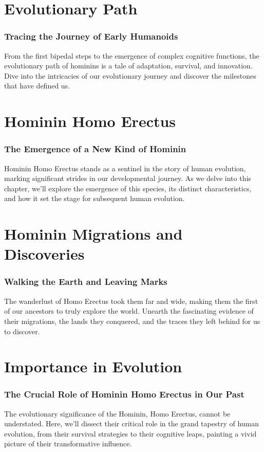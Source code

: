 \documentclass[a4paper,12pt]{book}
\begin{document}
\chapter{Evolutionary Path}
\subsection*{Tracing the Journey of Early Humanoids}
From the first bipedal steps to the emergence of complex cognitive functions, the evolutionary path of hominins is a tale of adaptation, survival, and innovation. Dive into the intricacies of our evolutionary journey and discover the milestones that have defined us.

\chapter{Hominin Homo Erectus}
\subsection*{The Emergence of a New Kind of Hominin}
Hominin Homo Erectus stands as a sentinel in the story of human evolution, marking significant strides in our developmental journey. As we delve into this chapter, we'll explore the emergence of this species, its distinct characteristics, and how it set the stage for subsequent human evolution.

\chapter{Hominin Migrations and Discoveries}
\subsection*{Walking the Earth and Leaving Marks}
The wanderlust of Homo Erectus took them far and wide, making them the first of our ancestors to truly explore the world. Unearth the fascinating evidence of their migrations, the lands they conquered, and the traces they left behind for us to discover.

\chapter{Importance in Evolution}
\subsection*{The Crucial Role of Hominin Homo Erectus in Our Past}
The evolutionary significance of the Hominin, Homo Erectus, cannot be understated. Here, we'll dissect their critical role in the grand tapestry of human evolution, from their survival strategies to their cognitive leaps, painting a vivid picture of their transformative influence.
\end{document}
